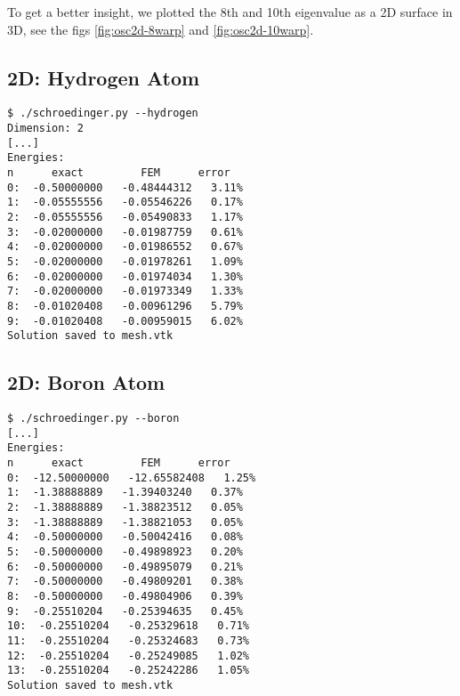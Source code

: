 

To get a better insight, we plotted the 8th and 10th eigenvalue as a 2D surface
in 3D, see the figs \ref{fig:osc2d-8warp} and \ref{fig:osc2d-10warp}.



\subsection{2D: Hydrogen Atom}

\begin{lstlisting}
$ ./schroedinger.py --hydrogen
Dimension: 2
[...]
Energies:
n      exact         FEM      error
0:  -0.50000000   -0.48444312   3.11%
1:  -0.05555556   -0.05546226   0.17%
2:  -0.05555556   -0.05490833   1.17%
3:  -0.02000000   -0.01987759   0.61%
4:  -0.02000000   -0.01986552   0.67%
5:  -0.02000000   -0.01978261   1.09%
6:  -0.02000000   -0.01974034   1.30%
7:  -0.02000000   -0.01973349   1.33%
8:  -0.01020408   -0.00961296   5.79%
9:  -0.01020408   -0.00959015   6.02%
Solution saved to mesh.vtk
\end{lstlisting}

\subsection{2D: Boron Atom}

\begin{lstlisting}
$ ./schroedinger.py --boron
[...]
Energies:
n      exact         FEM      error
0:  -12.50000000   -12.65582408   1.25%
1:  -1.38888889   -1.39403240   0.37%
2:  -1.38888889   -1.38823512   0.05%
3:  -1.38888889   -1.38821053   0.05%
4:  -0.50000000   -0.50042416   0.08%
5:  -0.50000000   -0.49898923   0.20%
6:  -0.50000000   -0.49895079   0.21%
7:  -0.50000000   -0.49809201   0.38%
8:  -0.50000000   -0.49804906   0.39%
9:  -0.25510204   -0.25394635   0.45%
10:  -0.25510204   -0.25329618   0.71%
11:  -0.25510204   -0.25324683   0.73%
12:  -0.25510204   -0.25249085   1.02%
13:  -0.25510204   -0.25242286   1.05%
Solution saved to mesh.vtk
\end{lstlisting}

